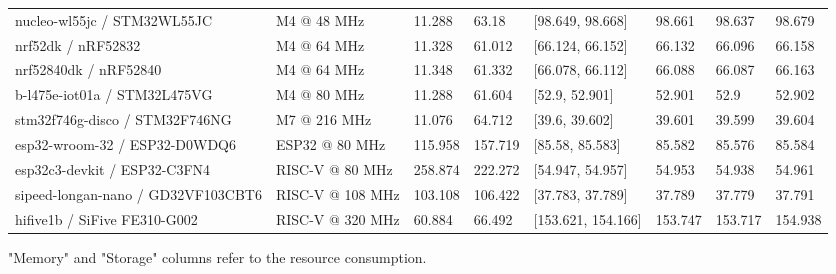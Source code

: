 \begin{table}[ht]
\begin{threeparttable}
\begin{tabular}{llllllll}
nucleo-wl55jc   / STM32WL55JC  & M4 @ 48 MHz           & 11.288                       & 63.18                         & {[}98.649, 98.668{]}   & 98.661  & 98.637  & 98.679  \\
nrf52dk   / nRF52832           & M4 @ 64 MHz           & 11.328                       & 61.012                        & {[}66.124, 66.152{]}   & 66.132  & 66.096  & 66.158  \\
nrf52840dk   / nRF52840        & M4 @ 64 MHz           & 11.348                       & 61.332                        & {[}66.078, 66.112{]}   & 66.088  & 66.087  & 66.163  \\
b-l475e-iot01a   / STM32L475VG & M4 @ 80 MHz           & 11.288                       & 61.604                        & {[}52.9, 52.901{]}     & 52.901  & 52.9    & 52.902  \\
stm32f746g-disco / STM32F746NG       & M7 @ 216 MHz          & 11.076                       & 64.712                        & {[}39.6, 39.602{]}     & 39.601  & 39.599  & 39.604 \\\hline

esp32-wroom-32 / ESP32-D0WDQ6  & ESP32 @ 80 MHz       & 115.958                       & 157.719                        & {[}85.58, 85.583{]} & 85.582  & 85.576 & 85.584
\\\hline
esp32c3-devkit / ESP32-C3FN4 &  RISC-V @ 80 MHz      &    258.874       &    222.272   & [54.947, 54.957]   &      54.953    &   54.938   &    54.961 \\
sipeed-longan-nano / GD32VF103CBT6  & RISC-V @ 108 MHz &     103.108     &    106.422 & [37.783, 37.789]   &   37.789   &    37.779    &   37.791 \\
hifive1b / SiFive FE310-G002  & RISC-V @ 320 MHz       & 60.884                       & 66.492                        & {[}153.621, 154.166{]} & 153.747 & 153.717 & 154.938 \\

\hline
\end{tabular}
\begin{tablenotes}
    \item "Memory" and "Storage" columns refer to the resource consumption.
\end{tablenotes}
\end{threeparttable}
\end{table}

